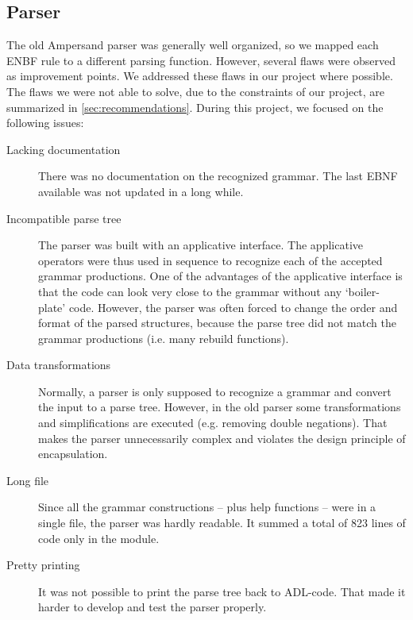 
\subsection{Parser}
\label{analysis:parser}
The old Ampersand parser was generally well organized, so we mapped each ENBF rule to a different parsing function.
However, several flaws were observed as improvement points.
We addressed these flaws in our project where possible.
The flaws we were not able to solve, due to the constraints of our project, are summarized in \autoref{sec:recommendations}.
During this project, we focused on the following issues:
\begin{description}
  \item[Lacking documentation]
    There was no documentation on the recognized grammar.
    The last EBNF available was not updated in a long while.
  
  \item[Incompatible parse tree]
    The parser was built with an applicative interface.
    The applicative operators were thus used in sequence to recognize each of the accepted grammar productions.
    One of the advantages of the applicative interface is that the code can look very close to the grammar without any `boiler-plate' code.
    However, the parser was often forced to change the order and format of the parsed structures, because the parse tree did not match the grammar productions (i.e. many rebuild functions).
  
  \item[Data transformations]
    Normally, a parser is only supposed to recognize a grammar and convert the input to a parse tree.
    However, in the old parser some transformations and simplifications are executed (e.g. removing double negations).
    That makes the parser unnecessarily complex and violates the design principle of encapsulation.
  
  \item[Long file]
    Since all the grammar constructions -- plus help functions -- were in a single file, the parser was hardly readable.
    It summed a total of 823 lines of code only in the  module.
  
  \item[Pretty printing]
    It was not possible to print the parse tree back to ADL-code.
    That made it harder to develop and test the parser properly.
  

\end{description}

